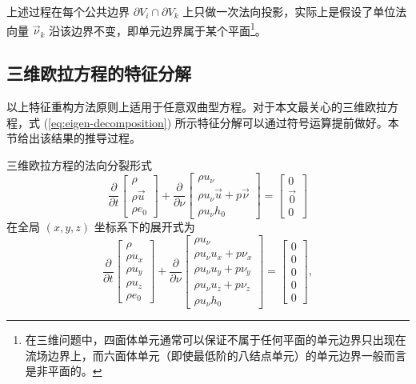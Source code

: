 上述过程在每个公共边界 $\partial V_{i}\cap\partial V_{k}$ 上只做一次法向投影，实际上是假设了单位法向量
$\vec{\nu}_{k}$ 沿该边界不变，即单元边界属于某个平面\footnote{在三维问题中，四面体单元通常可以保证不属于任何平面的单元边界只出现在流场边界上，而六面体单元（即使最低阶的八结点单元）的单元边界一般而言是非平面的。}。

\subsection{三维欧拉方程的特征分解}

以上特征重构方法原则上适用于任意双曲型方程。对于本文最关心的三维欧拉方程，式 (\ref{eq:eigen-decomposition})
所示特征分解可以通过符号运算提前做好。本节给出该结果的推导过程。

三维欧拉方程的法向分裂形式
\begin{equation}
\frac{\partial}{\partial t}\begin{bmatrix}\rho\\
\rho\vec{u}\\
\rho e_{0}
\end{bmatrix}+\frac{\partial}{\partial\nu}\begin{bmatrix}\rho u_{\nu}\\
\rho u_{\nu}\vec{u}+p\vec{\nu}\\
\rho u_{\nu}h_{0}
\end{bmatrix}=\begin{bmatrix}0\\
\vec{0}\\
0
\end{bmatrix}
\end{equation}
在全局 $(x,y,z)$ 坐标系下的展开式为
\begin{equation}
\frac{\partial}{\partial t}\begin{bmatrix}\rho\\
\rho u_{x}\\
\rho u_{y}\\
\rho u_{z}\\
\rho e_{0}
\end{bmatrix}+\frac{\partial}{\partial\nu}\begin{bmatrix}\rho u_{\nu}\\
\rho u_{\nu}u_{x}+p\nu_{x}\\
\rho u_{\nu}u_{y}+p\nu_{y}\\
\rho u_{\nu}u_{z}+p\nu_{z}\\
\rho u_{\nu}h_{0}
\end{bmatrix}=\begin{bmatrix}0\\
0\\
0\\
0\\
0
\end{bmatrix},
\end{equation}
